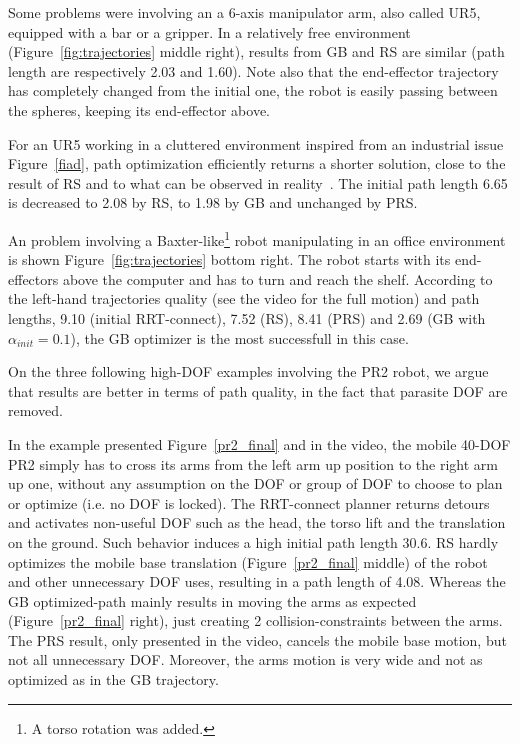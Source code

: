 \documentclass{tADR2e}
\begin{document}
Some problems were 
involving an a 6-axis manipulator arm, also called UR5, equipped with a bar or a 
gripper.
In a relatively free environment (Figure~\ref{fig:trajectories} middle right), 
results from GB and RS are similar (path length are respectively 2.03 and 1.60). 
Note also that the end-effector trajectory has completely changed from the initial 
one, the robot is easily passing between the spheres, keeping its end-effector 
above.

For an UR5 working in a cluttered environment inspired from an industrial issue 
Figure~\ref{fiad}, path optimization efficiently returns a shorter solution, close 
to the result of RS and to what can be observed in reality~\cite{factory-day-video}. 
The initial path length 6.65 is decreased to 2.08 by RS, to 
1.98 by GB and unchanged by PRS.

An problem involving a Baxter-like\footnote{A torso rotation was added.} robot manipulating in an office environment is shown Figure~\ref{fig:trajectories} bottom right. The robot starts with its end-effectors above the computer and has to turn and reach the shelf. According to the left-hand trajectories quality (see the video for the full motion) and path lengths, 9.10 (initial RRT-connect), 7.52 (RS), 8.41 (PRS) and 2.69 (GB with $\alpha_{init}=0.1$), the GB optimizer is the most successfull in this case.

\vspace{0.4cm}

On the three following high-DOF examples involving the PR2 robot, we argue that 
results are better in terms of path quality, in the fact that parasite DOF are 
removed.

In the example presented Figure~\ref{pr2_final} and in the video, the mobile 
40-DOF PR2 simply has to cross its arms from 
the left arm up position to the right arm up one, without any assumption on the DOF or group of DOF to choose to plan or optimize (i.e. no DOF is locked). 
The RRT-connect planner 
returns detours and activates non-useful DOF such as the head, the torso lift 
and the translation on the ground. Such behavior induces a high initial path length 
30.6. RS hardly optimizes the mobile base 
translation (Figure~\ref{pr2_final} middle) of the robot and other unnecessary DOF 
uses, resulting in a path length of 4.08.
Whereas the GB optimized-path mainly 
results in moving the arms as expected (Figure~\ref{pr2_final} right), just creating 2 collision-constraints between the arms. The PRS 
result, only presented in the video, cancels the mobile base motion, but not all 
unnecessary DOF. Moreover, the arms motion is very wide and not as optimized as in 
the GB trajectory.
\end{document}
